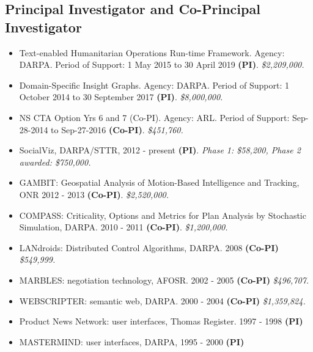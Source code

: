 \documentclass{article}
\begin{document}
\subsection*{Principal Investigator and Co-Principal Investigator}
\begin{itemize}

\item Text-enabled Humanitarian Operations Run-time Framework. Agency: DARPA. Period of Support: 1 May 2015 to 30 April 2019 {\bf(PI)}. 
{\em \$2,209,000.}

\item Domain-Specific Insight Graphs. Agency: DARPA. Period of Support: 1 October 2014 to 30 September 2017 {\bf(PI)}. 
{\em \$8,000,000.}
 
\item NS CTA Option Yrs 6 and 7 (Co-PI). Agency: ARL. Period of Support: Sep-28-2014 to Sep-27-2016 {\bf(Co-PI)}. 
 {\em \$451,760. }

\item SocialViz, DARPA/STTR, 2012 - present {\bf(PI)}. 
{\em Phase 1: \$58,200, Phase 2 awarded: \$750,000.}

\item GAMBIT: Geospatial Analysis of Motion-Based Intelligence and Tracking, ONR 2012 - 2013 {\bf(Co-PI)}. 
{\em \$2,520,000.}

\item COMPASS: Criticality, Options and Metrics for Plan Analysis by Stochastic Simulation, DARPA. 2010 - 2011 {\bf(Co-PI)}. 
{\em \$1,200,000.}

\item LANdroids: Distributed Control Algorithms, DARPA. 2008 {\bf(Co-PI)}
{\em \$549,999.}

\item MARBLES: negotiation technology, AFOSR. 2002 - 2005 {\bf(Co-PI)}
{\em \$496,707.}

\item WEBSCRIPTER: semantic web, DARPA. 2000 - 2004 {\bf(Co-PI)}
{\em \$1,359,824.}

\item Product News Network: user interfaces, Thomas Register. 1997 - 1998 {\bf(PI)}

\item MASTERMIND: user interfaces, DARPA, 1995 - 2000 {\bf(PI)}

\end{itemize}
\end{document}
